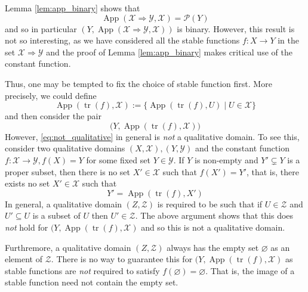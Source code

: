 \documentclass[12pt]{article}
\theoremstyle{plain}
\theoremstyle{definition}
\newcommand{\scr}[1]{\mathscr{#1}}
\newcommand{\call}[1]{\mathcal{#1}}
\newcommand{\lto}{\longrightarrow}
\begin{document}
	Lemma \ref{lem:app_binary} shows that 
	\begin{equation}
	\operatorname{App}(\scr{X} \Rightarrow \scr{Y}, \scr{X}) = \call{P}(Y)
	\end{equation}
and so in particular $(Y, \operatorname{App}(\scr{X} \Rightarrow \scr{Y}, \scr{X}))$ is binary. However, this result is not so interesting, as we have considered all the stable functions $f: X \lto Y$ in the set $\scr{X} \Rightarrow \scr{Y}$ and the proof of Lemma \ref{lem:app_binary} makes critical use of the constant function.

Thus, one may be tempted to fix the choice of stable function first. More precisely, we could define
\begin{equation}
	\operatorname{App}(\operatorname{tr}(f),\scr{X}) := \{ \operatorname{App}(\operatorname{tr}(f),U) \mid U \in \scr{X} \}
	\end{equation}
and then consider the pair
\begin{equation}\label{eq:not_qualitative}
	\big(Y,\operatorname{App}(\operatorname{tr}(f),\scr{X})\big)
	\end{equation}
However, \eqref{eq:not_qualitative} in general is \emph{not} a qualitative domain. To see this, consider two qualitative domains $(X, \scr{X}), (Y, \scr{Y})$ and the constant function $f: \scr{X} \lto \scr{Y}, f(X) = Y$ for some fixed set $Y \in \scr{Y}$. If $Y$ is non-empty and $Y' \subsetneq Y$ is a proper subset, then there is no set $X' \in \scr{X}$ such that $f(X') = Y'$, that is, there exists no set $X' \in \scr{X}$ such that
\begin{equation}
	Y' = \operatorname{App}(\operatorname{tr}(f), X')
	\end{equation}
In general, a qualitative domain $(Z, \scr{Z})$ is required to be such that if $U \in \scr{Z}$ and $U' \subseteq U$ is a subset of $U$ then $U' \in \scr{Z}$. The above argument shows that this does \emph{not} hold for $\big(Y, \operatorname{App}(\operatorname{tr}(f), \scr{X})$ and so this is not a qualitative domain.

Furthremore, a qualitative domain $(Z, \scr{Z})$ always has the empty set $\varnothing$ as an element of $\scr{Z}$. There is no way to guarantee this for $\big(Y, \operatorname{App}(\operatorname{tr}(f), \scr{X})$ as stable functions are \emph{not} required to satisfy $f(\varnothing) = \varnothing$. That is, the image of a stable function need not contain the empty set.
	
\end{document}
